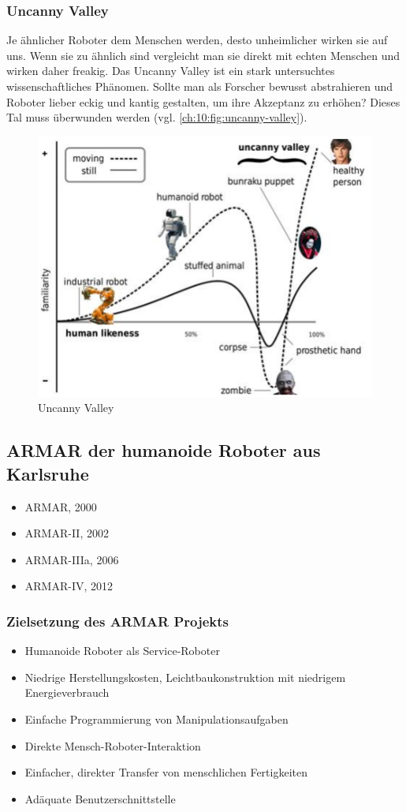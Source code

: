 \subsubsection{Uncanny Valley}
Je ähnlicher Roboter dem Menschen werden, desto unheimlicher wirken sie auf uns.
Wenn sie zu ähnlich sind vergleicht man sie direkt mit echten Menschen und wirken daher freakig. Das Uncanny Valley ist ein stark untersuchtes wissenschaftliches Phänomen.
Sollte man als Forscher bewusst abstrahieren und Roboter lieber eckig und kantig gestalten, um ihre Akzeptanz zu erhöhen?
Dieses \glqq Tal\grqq{}  muss überwunden werden (vgl. \autoref{ch:10:fig:uncanny-valley}).
\begin{figure}
	\centering
	\includegraphics[width=.5\textwidth]{figures/uncanny_valley.png}
	\caption{Uncanny Valley}
	\label{ch:10:fig:uncanny-valley}
\end{figure}

\subsection{ARMAR der humanoide Roboter aus Karlsruhe}
\begin{itemize}
	\item ARMAR, 2000
	\item ARMAR-II, 2002
	\item ARMAR-IIIa, 2006
	\item ARMAR-IV, 2012
\end{itemize}

\subsubsection{Zielsetzung des ARMAR Projekts}
\begin{itemize}
	\item Humanoide Roboter als Service-Roboter
	\item Niedrige Herstellungskosten, Leichtbaukonstruktion mit niedrigem Energieverbrauch
	\item Einfache Programmierung von Manipulationsaufgaben
	\item Direkte Mensch-Roboter-Interaktion
	\item Einfacher, direkter Transfer von menschlichen Fertigkeiten
	\item Adäquate Benutzerschnittstelle
\end{itemize}

